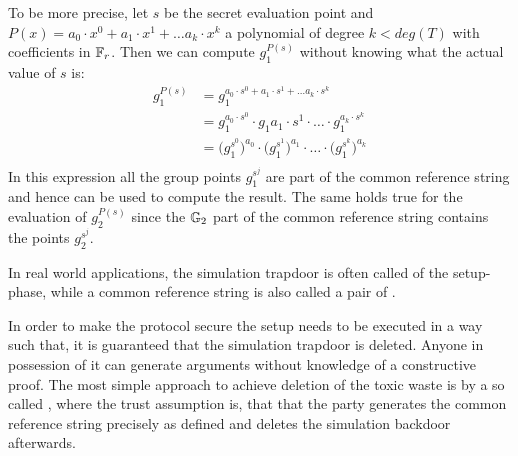 To be more precise, let $s$ be the secret evaluation point and $P(x)=a_0\cdot x^0 + a_1\cdot x^1 + \ldots a_k\cdot x^k$ a polynomial of degree $k<deg(T)$ with coefficients in $\mathbb{F}_r$. Then we can compute $g_1^{P(s)}$ without knowing what the actual value of $s$ is:
\begin{align*}
g_1^{P(s)} & = g_1^{a_0\cdot s^0 + a_1\cdot s^1 + \ldots a_k\cdot s^k} \\
 & = g_1^{a_0\cdot s^0} \cdot g_1{a_1\cdot s^1} \cdot \ldots \cdot g_1^{a_k\cdot s^k}\\
 & = \Big(g_1^{s^0}\Big)^{a_0} \cdot \Big(g_1^{s^1}\Big)^{a_1} \cdot \ldots \cdot \Big(g_1^{s^k}\Big)^{a_k}\\
\end{align*}
In this expression all the group points $g_1^{s^j}$ are part of the common reference string and hence can be used to compute the result. The same holds true for the evaluation of $g_2^{P(s)}$ since the $\mathbb{G}_2$ part of the common reference string contains the points $g_2^{s^j}$. 

In real world applications, the simulation trapdoor is often called  of the setup-phase, while a common reference string is also called a pair of . 

In order to make the protocol secure the setup needs to be executed in a way such that,  it is guaranteed that the simulation trapdoor is deleted. Anyone in possession of it can generate arguments without knowledge of a constructive proof. The most simple approach to achieve deletion of the toxic waste is by a so called , where the trust assumption is, that that the party generates the common reference string precisely as defined and deletes the simulation backdoor afterwards.

